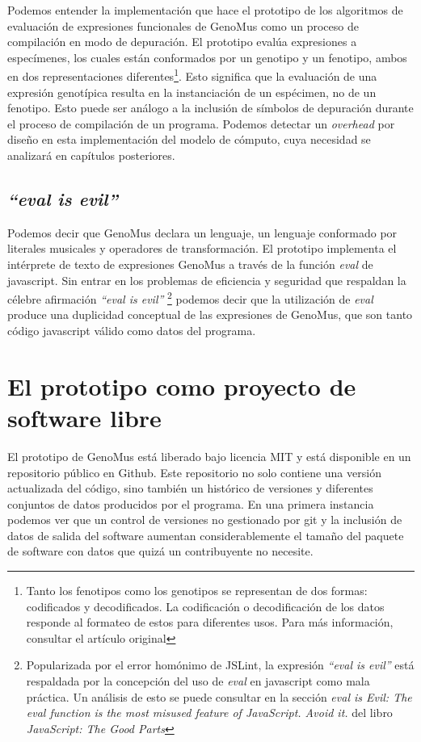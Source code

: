 Podemos entender la implementación que hace el prototipo de los algoritmos de evaluación de expresiones funcionales de GenoMus como un proceso de compilación en modo de depuración. El prototipo evalúa expresiones a especímenes, los cuales están conformados por un genotipo y un fenotipo, ambos en dos representaciones diferentes\footnote{Tanto los fenotipos como los genotipos se representan de dos formas: codificados y decodificados. La codificación o decodificación de los datos responde al formateo de estos para diferentes usos. Para más información, consultar el artículo original\cite{GenoMus-master}}. Esto significa que la evaluación de una expresión genotípica resulta en la instanciación de un espécimen, no de un fenotipo. Esto puede ser análogo a la inclusión de símbolos de depuración durante el proceso de compilación de un programa. Podemos detectar un \textit{overhead} por diseño en esta implementación del modelo de cómputo, cuya necesidad se analizará en capítulos posteriores.

\subsection{\textit{``eval is evil''}}\label{ssec:eval_evil}

Podemos decir que GenoMus declara un lenguaje, un lenguaje conformado por literales musicales y operadores de transformación. El prototipo implementa el intérprete de texto de expresiones GenoMus a través de la función \textit{eval} de javascript. Sin entrar en los problemas de eficiencia y seguridad que respaldan la célebre afirmación \textit{``eval is evil''} 
    \footnote{
    Popularizada por el error homónimo de JSLint, la expresión \textit{``eval is evil''} está respaldada por la concepción del uso de \textit{eval} en javascript como mala práctica. Un análisis de esto se puede consultar en la sección \textit{eval is Evil: The eval function is the most misused feature of JavaScript. Avoid it.} del libro \textit{JavaScript: The Good Parts}\cite{JavaScript_The_Good_Parts}}
podemos decir que la utilización de \textit{eval} produce una duplicidad conceptual de las expresiones de GenoMus, que son tanto código javascript válido como datos del programa.

\section{El prototipo como proyecto de software libre}

El prototipo de GenoMus está liberado bajo licencia MIT y está disponible en un repositorio público en Github\cite{GenoMus}. Este repositorio no solo contiene una versión actualizada del código, sino también un histórico de versiones y diferentes conjuntos de datos producidos por el programa. En una primera instancia podemos ver que un control de versiones no gestionado por git y la inclusión de datos de salida del software aumentan considerablemente el tamaño del paquete de software con datos que quizá un contribuyente no necesite.

